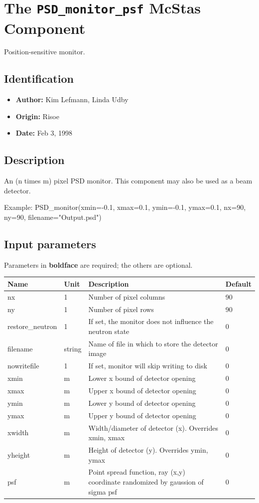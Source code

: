 \section{The \texttt{PSD\_monitor\_psf} McStas Component}
Position-sensitive monitor.

\subsection*{Identification}
\begin{itemize}
  \item \textbf{Author:} Kim Lefmann, Linda Udby
  \item \textbf{Origin:} Risoe
  \item \textbf{Date:} Feb 3, 1998
\end{itemize}

\subsection*{Description}
An (n times m) pixel PSD monitor. This component may also be used as a beam detector.

Example: PSD\_monitor(xmin=-0.1, xmax=0.1, ymin=-0.1, ymax=0.1, nx=90, ny=90, filename="Output.psd")

\subsection*{Input parameters}
Parameters in \textbf{boldface} are required; the others are optional.

\begin{longtable}{p{}p{}p{}p{}}
\toprule
\textbf{Name} & \textbf{Unit} & \textbf{Description} & \textbf{Default} \\
\midrule
\endhead
nx & 1 & Number of pixel columns & 90 \\
ny & 1 & Number of pixel rows & 90 \\
restore\_neutron & 1 & If set, the monitor does not influence the neutron state & 0 \\
filename & string & Name of file in which to store the detector image & 0 \\
nowritefile & 1 & If set, monitor will skip writing to disk & 0 \\
xmin & m & Lower x bound of detector opening & 0 \\
xmax & m & Upper x bound of detector opening & 0 \\
ymin & m & Lower y bound of detector opening & 0 \\
ymax & m & Upper y bound of detector opening & 0 \\
xwidth & m & Width/diameter of detector (x). Overrides xmin, xmax & 0 \\
yheight & m & Height of detector (y). Overrides ymin, ymax & 0 \\
psf & m & Point spread function, ray (x,y) coordinate randomized by gaussion of sigma psf & 0 \\
\bottomrule
\end{longtable}

